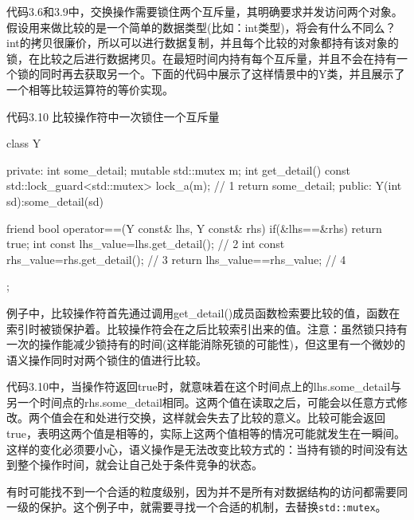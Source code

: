 代码3.6和3.9中，交换操作需要锁住两个互斥量，其明确要求并发访问两个对象。假设用来做比较的是一个简单的数据类型(比如：int类型)，将会有什么不同么？int的拷贝很廉价，所以可以进行数据复制，并且每个比较的对象都持有该对象的锁，在比较之后进行数据拷贝。在最短时间内持有每个互斥量，并且不会在持有一个锁的同时再去获取另一个。下面的代码中展示了这样情景中的Y类，并且展示了一个相等比较运算符的等价实现。

代码3.10 比较操作符中一次锁住一个互斥量

\begin{cpp}
class Y
{
private:
  int some_detail;
  mutable std::mutex m;
  int get_detail() const
  {
    std::lock_guard<std::mutex> lock_a(m);  // 1
    return some_detail;
  }
public:
  Y(int sd):some_detail(sd){}

  friend bool operator==(Y const& lhs, Y const& rhs)
  {
    if(&lhs==&rhs)
      return true;
    int const lhs_value=lhs.get_detail();  // 2
    int const rhs_value=rhs.get_detail();  // 3
    return lhs_value==rhs_value;  // 4
  }
};
\end{cpp}

例子中，比较操作符首先通过调用get\_detail()成员函数检索要比较的值，函数在索引时被锁保护着。比较操作符会在之后比较索引出来的值。注意：虽然锁只持有一次的操作能减少锁持有的时间(这样能消除死锁的可能性)，但这里有一个微妙的语义操作同时对两个锁住的值进行比较。

代码3.10中，当操作符返回true时，就意味着在这个时间点上的lhs.some\_detail与另一个时间点的rhs.some\_detail相同。这两个值在读取之后，可能会以任意方式修改。两个值会在和处进行交换，这样就会失去了比较的意义。比较可能会返回true，表明这两个值是相等的，实际上这两个值相等的情况可能就发生在一瞬间。这样的变化必须要小心，语义操作是无法改变比较方式的：当持有锁的时间没有达到整个操作时间，就会让自己处于条件竞争的状态。

有时可能找不到一个合适的粒度级别，因为并不是所有对数据结构的访问都需要同一级的保护。这个例子中，就需要寻找一个合适的机制，去替换\texttt{std::mutex}。



